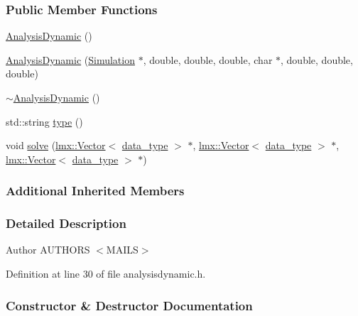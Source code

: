 \subsubsection*{Public Member Functions}
\begin{DoxyCompactItemize}
\item 
\hyperlink{classmknix_1_1_analysis_dynamic_a1457ddff8dfa14a90605248f4b953851}{Analysis\+Dynamic} ()
\item 
\hyperlink{classmknix_1_1_analysis_dynamic_a452203e81d27283089fe500b32c7ab55}{Analysis\+Dynamic} (\hyperlink{classmknix_1_1_simulation}{Simulation} $\ast$, double, double, double, char $\ast$, double, double, double)
\item 
\hyperlink{classmknix_1_1_analysis_dynamic_a85fd7662ea3228c608c6761ffc4e46d4}{$\sim$\+Analysis\+Dynamic} ()
\item 
std\+::string \hyperlink{classmknix_1_1_analysis_dynamic_a10045ff80be02d24dc08ad7da248844f}{type} ()
\item 
void \hyperlink{classmknix_1_1_analysis_dynamic_aeb742faac9f810bb18c011cf24e67c2c}{solve} (\hyperlink{classlmx_1_1_vector}{lmx\+::\+Vector}$<$ \hyperlink{namespacemknix_a16be4b246fbf2cceb141e3a179111020}{data\+\_\+type} $>$ $\ast$, \hyperlink{classlmx_1_1_vector}{lmx\+::\+Vector}$<$ \hyperlink{namespacemknix_a16be4b246fbf2cceb141e3a179111020}{data\+\_\+type} $>$ $\ast$, \hyperlink{classlmx_1_1_vector}{lmx\+::\+Vector}$<$ \hyperlink{namespacemknix_a16be4b246fbf2cceb141e3a179111020}{data\+\_\+type} $>$ $\ast$)
\end{DoxyCompactItemize}
\subsubsection*{Additional Inherited Members}


\subsubsection{Detailed Description}
\begin{DoxyAuthor}{Author}
A\+U\+T\+H\+O\+R\+S $<$\+M\+A\+I\+L\+S$>$ 
\end{DoxyAuthor}


Definition at line 30 of file analysisdynamic.\+h.



\subsubsection{Constructor \& Destructor Documentation}
\hypertarget{classmknix_1_1_analysis_dynamic_a1457ddff8dfa14a90605248f4b953851}{}
